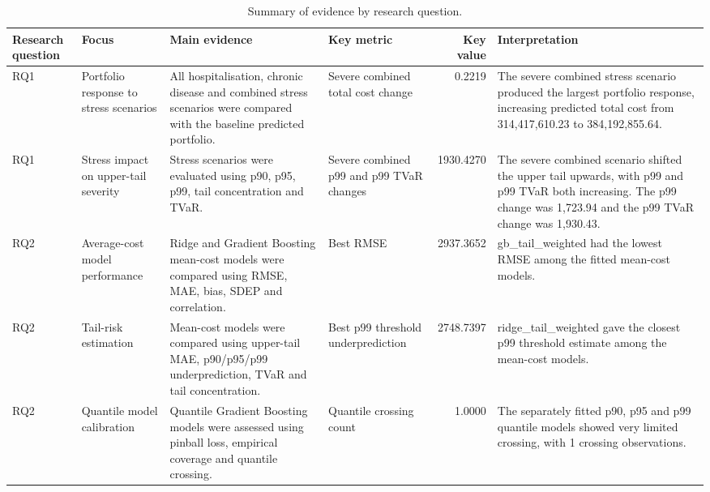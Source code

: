 \begin{table}
\caption{Summary of evidence by research question.}
\label{tab:09-research-question-summary}
\begin{tabular}{llllrl}
\toprule
Research question & Focus & Main evidence & Key metric & Key value & Interpretation \\
\midrule
RQ1 & Portfolio response to stress scenarios & All hospitalisation, chronic disease and combined stress scenarios were compared with the baseline predicted portfolio. & Severe combined total cost change & 0.2219 & The severe combined stress scenario produced the largest portfolio response, increasing predicted total cost from 314,417,610.23 to 384,192,855.64. \\
RQ1 & Stress impact on upper-tail severity & Stress scenarios were evaluated using p90, p95, p99, tail concentration and TVaR. & Severe combined p99 and p99 TVaR changes & 1930.4270 & The severe combined scenario shifted the upper tail upwards, with p99 and p99 TVaR both increasing. The p99 change was 1,723.94 and the p99 TVaR change was 1,930.43. \\
RQ2 & Average-cost model performance & Ridge and Gradient Boosting mean-cost models were compared using RMSE, MAE, bias, SDEP and correlation. & Best RMSE & 2937.3652 & gb_tail_weighted had the lowest RMSE among the fitted mean-cost models. \\
RQ2 & Tail-risk estimation & Mean-cost models were compared using upper-tail MAE, p90/p95/p99 underprediction, TVaR and tail concentration. & Best p99 threshold underprediction & 2748.7397 & ridge_tail_weighted gave the closest p99 threshold estimate among the mean-cost models. \\
RQ2 & Quantile model calibration & Quantile Gradient Boosting models were assessed using pinball loss, empirical coverage and quantile crossing. & Quantile crossing count & 1.0000 & The separately fitted p90, p95 and p99 quantile models showed very limited crossing, with 1 crossing observations. \\
\bottomrule
\end{tabular}
\end{table}
